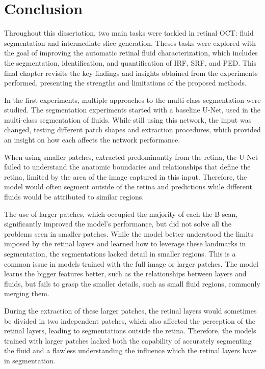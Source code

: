 \chapter{Conclusion}\label{Conclusion}

Throughout this dissertation, two main tasks were tackled in retinal OCT: fluid segmentation and intermediate slice generation. Theses tasks were explored with the goal of improving the automatic retinal fluid characterization, which includes the segmentation, identification, and quantification of IRF, SRF, and PED. This final chapter revisits the key findings and insights obtained from the experiments performed, presenting the strengths and limitations of the proposed methods.
\par
In the first experiments, multiple approaches to the multi-class segmentation were studied. The segmentation experiments started with a baseline U-Net, used in the multi-class segmentation of fluids. While  still using this network, the input was changed, testing different patch shapes and extraction procedures, which provided an insight on how each affects the network performance.
\par
When using smaller patches, extracted predominantly from the retina, the U-Net failed to understand the anatomic boundaries and relationships that define the retina, limited by the area of the image captured in this input. Therefore, the model would often segment outside of the retina and predictions while different fluids would be attributed to similar regions.
\par
The use of larger patches, which occupied the majority of each the B-scan, significantly improved the model's performance, but did not solve all the problems seen in smaller patches. While the model better understood the limits imposed by the retinal layers and learned how to leverage these landmarks in segmentation, the segmentations lacked detail in smaller regions. This is a common issue in models trained with the full image or larger patches. The model learns the bigger features better, such as the relationships between layers and fluids, but fails to grasp the smaller details, such as small fluid regions, commonly merging them.
\par
During the extraction of these larger patches, the retinal layers would sometimes be divided in two independent patches, which also affected the perception of the retinal layers, leading to segmentations outside the retina. Therefore, the models trained with larger patches lacked both the capability of accurately segmenting the fluid and a flawless understanding the influence which the retinal layers have in segmentation.

